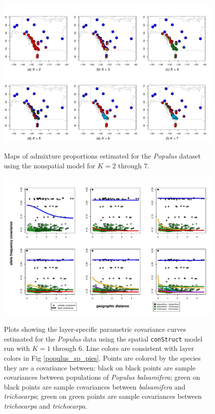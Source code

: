 \documentclass[10pt,letterpaper]{article}
\newcommand{\tri}{\textit{trichocarpa}}
\newcommand{\bals}{\textit{balsamifera}}
\begin{document}
\begin{figure}
	\centering
		{\includegraphics[width=\textwidth]{figs/populus/populus_nsp_pies.pdf}}
	\caption{
	Maps of admixture proportions estimated for the \textit{Populus} dataset 
	using the nonspatial model for $K=2$ through 7.
    }\label{populus_nsp_pies}
\end{figure}

\begin{figure}
	\centering
		{\includegraphics[width=\textwidth]{figs/populus/populus_sp_layer_covs.pdf}}
	\caption{
	Plots showing the layer-specific parametric covariance curves
	estimated for the \textit{Populus} data using 
	the spatial \texttt{conStruct} model run with $K=1$ through 6.
	Line colors are consistent with layer colors in Fig \ref{populus_sp_pies}.
	Points are colored by the species they are a covariance between:
	black on black points are sample covariances between populations of \textit{Populus balsamifera};
	green on black points are sample covariances between \bals{} and \tri{};
	green on green points are sample covariances between \tri{} and \tri{}.
    }\label{populus_sp_layer_covs}
\end{figure}
\end{document}
